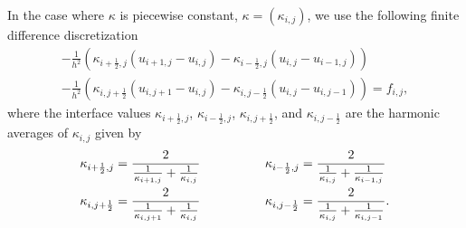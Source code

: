 \documentclass[preprint,12pt]{elsarticle}
\begin{document}
In the case where $\kappa$ is piecewise constant, $\kappa = (\kappa_{i,j})$, we use the following finite difference discretization
\begin{multline} \label{eqn:non-const-fd}
    -\frac{1}{h^2}\left( \kappa_{i+\frac{1}{2}, j}(u_{i+1, j} - u_{i,j}) - \kappa_{i-\frac{1}{2}, j}(u_{i, j} - u_{i-1,j}) \right) \\
    -\frac{1}{h^2}\left( \kappa_{i, j+\frac{1}{2}}(u_{i, j+1} - u_{i,j}) - \kappa_{i, j-\frac{1}{2}}(u_{i, j} - u_{i,j-1}) \right)
    = f_{i, j},
\end{multline}
where the interface values $\kappa_{i+\frac{1}{2}, j}$, $\kappa_{i-\frac{1}{2}, j}$, $\kappa_{i, j+\frac{1}{2}}$, and $\kappa_{i, j-\frac{1}{2}}$ are the harmonic averages of $\kappa_{i,j}$ given by
\begin{align}
    \begin{split}
        \kappa_{i+\frac{1}{2}, j} &= \frac{2}{\frac{1}{\kappa_{i + 1, j}} + \frac{1}{\kappa_{i,  j}}} \hspace{18mm} 
        \kappa_{i-\frac{1}{2}, j} = \frac{2}{\frac{1}{\kappa_{i, j}} + \frac{1}{\kappa_{i - 1,  j}}} \\
        \kappa_{i, j+\frac{1}{2}} &= \frac{2}{\frac{1}{\kappa_{i, j + 1}} + \frac{1}{\kappa_{i,  j}}} \hspace{18mm} 
        \kappa_{i, j-\frac{1}{2}} = \frac{2}{\frac{1}{\kappa_{i, j}} + \frac{1}{\kappa_{i,  j - 1}}}.
    \end{split}
\end{align}
\end{document}
